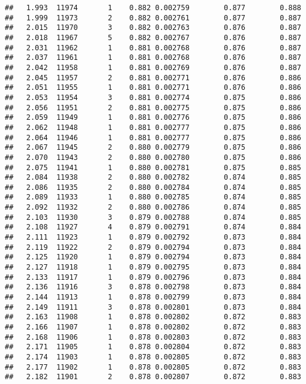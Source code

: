 \documentclass[
]{book}
\begin{document}
\begin{verbatim}
##   1.993  11974       1    0.882 0.002759        0.877        0.888
##   1.999  11973       2    0.882 0.002761        0.877        0.887
##   2.015  11970       3    0.882 0.002763        0.876        0.887
##   2.018  11967       5    0.882 0.002767        0.876        0.887
##   2.031  11962       1    0.881 0.002768        0.876        0.887
##   2.037  11961       1    0.881 0.002768        0.876        0.887
##   2.042  11958       1    0.881 0.002769        0.876        0.887
##   2.045  11957       2    0.881 0.002771        0.876        0.886
##   2.051  11955       1    0.881 0.002771        0.876        0.886
##   2.053  11954       3    0.881 0.002774        0.875        0.886
##   2.056  11951       2    0.881 0.002775        0.875        0.886
##   2.059  11949       1    0.881 0.002776        0.875        0.886
##   2.062  11948       1    0.881 0.002777        0.875        0.886
##   2.064  11946       1    0.881 0.002777        0.875        0.886
##   2.067  11945       2    0.880 0.002779        0.875        0.886
##   2.070  11943       2    0.880 0.002780        0.875        0.886
##   2.075  11941       1    0.880 0.002781        0.875        0.885
##   2.084  11938       2    0.880 0.002782        0.874        0.885
##   2.086  11935       2    0.880 0.002784        0.874        0.885
##   2.089  11933       1    0.880 0.002785        0.874        0.885
##   2.092  11932       2    0.880 0.002786        0.874        0.885
##   2.103  11930       3    0.879 0.002788        0.874        0.885
##   2.108  11927       4    0.879 0.002791        0.874        0.884
##   2.111  11923       1    0.879 0.002792        0.873        0.884
##   2.119  11922       2    0.879 0.002794        0.873        0.884
##   2.125  11920       1    0.879 0.002794        0.873        0.884
##   2.127  11918       1    0.879 0.002795        0.873        0.884
##   2.133  11917       1    0.879 0.002796        0.873        0.884
##   2.136  11916       3    0.878 0.002798        0.873        0.884
##   2.144  11913       1    0.878 0.002799        0.873        0.884
##   2.149  11911       3    0.878 0.002801        0.873        0.884
##   2.163  11908       1    0.878 0.002802        0.872        0.883
##   2.166  11907       1    0.878 0.002802        0.872        0.883
##   2.168  11906       1    0.878 0.002803        0.872        0.883
##   2.171  11905       1    0.878 0.002804        0.872        0.883
##   2.174  11903       1    0.878 0.002805        0.872        0.883
##   2.177  11902       1    0.878 0.002805        0.872        0.883
##   2.182  11901       2    0.878 0.002807        0.872        0.883

\end{verbatim}
\end{document}
